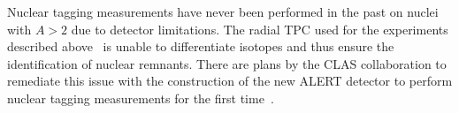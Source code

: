 Nuclear tagging measurements have never been performed in the past
on nuclei with $A>2$ due to detector limitations. The radial TPC used 
for the experiments described above~\cite{Baillie:2011za}
is unable to differentiate isotopes and thus ensure the identification of 
nuclear remnants. There are plans by the CLAS collaboration to remediate this issue
with the construction of the new ALERT detector to perform nuclear tagging measurements 
for the first time~\cite{Armstrong:2017zqr,Armstrong:2017zcm}.

